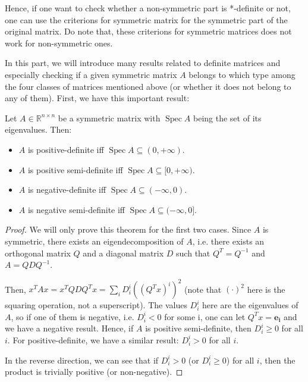 Hence, if one want to check whether a non-symmetric part is *-definite or not,
one can use the criterions for symmetric matrix for the symmetric part of the
original matrix. Do note that, these criterions for symmetric matrices does not
work for non-symmetric ones.

In this part, we will introduce many results related to definite matrices and
especially checking if a given symmetric matrix \( A \) belongs to which type among the
four classes of matrices mentioned above (or whether it does not belong to any
of them). First, we have this important result:

\begin{theorem}
\label{thr:Eigenvalues of a definite matrix}
  Let \( A \in \mathbb{R}^{n\times n} \) be a symmetric matrix with \(
  \operatorname{Spec} A \) being the set of its eigenvalues. Then:
  \begin{itemize}
  \item \( A \) is positive-definite iff \( \operatorname{Spec} A \subseteq (0,
    +\infty) \).
  \item \( A \) is positive semi-definite iff \( \operatorname{Spec} A \subseteq [0,
    +\infty) \).
  \item \( A \) is negative-definite iff \( \operatorname{Spec} A \subseteq
    (-\infty, 0)\).
  \item \( A \) is negative semi-definite iff \( \operatorname{Spec} A \subseteq
    (-\infty, 0]\).
  \end{itemize}
\end{theorem}

\begin{proof}
  We will only prove this theorem for the first two cases. Since \( A \) is
  symmetric, there exists an eigendecomposition of \( A \), i.e. there exists an
  orthogonal matrix \( Q \) and a diagonal matrix \( D \) such that \( Q^{T} =
  Q^{-1} \) and \( A = QDQ^{-1} \).

  Then, \( x^{T}Ax = x^{T}QDQ^{T}x = \sum_{i} D^{i}_{i}((Q^{T}x)^{i})^2 \) (note
  that \( (\cdot)^2 \) here is the squaring operation, not a superscript). The
  values \( D_{i}^{i} \) here are the eigenvalues of \( A \), so if one of them
  is negative, i.e. \( D^{i}_{i} < 0 \) for some i, one can let \( Q^{T}x =
  \mathbf{e_{i}} \) and we have a negative result. Hence, if \( A \) is
  positive semi-definite, then \( D^{i}_{i} \ge 0 \) for all \( i \). For
  positive-definite, we have a similar result: \( D^{i}_{i} > 0 \) for all \( i
  \).

  In the reverse direction, we can see that if \( D^{i}_{i} > 0 \) (or \(
  D^{i}_{i} \ge 0 \)) for all \( i
  \), then the product is trivially positive (or non-negative).
\end{proof}

